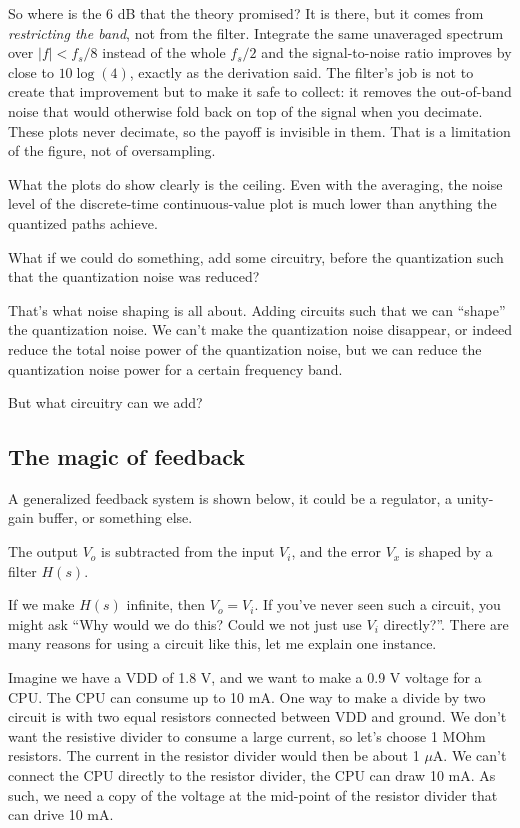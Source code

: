So where is the 6 dB that the theory promised? It is there, but it comes
from \emph{restricting the band}, not from the filter. Integrate the
same unaveraged spectrum over \(\vert f\vert < f_s/8\) instead of the
whole \(f_s/2\) and the signal-to-noise ratio improves by close to
\(10\log(4)\), exactly as the derivation said. The filter's job is not
to create that improvement but to make it safe to collect: it removes
the out-of-band noise that would otherwise fold back on top of the
signal when you decimate. These plots never decimate, so the payoff is
invisible in them. That is a limitation of the figure, not of
oversampling.

What the plots do show clearly is the ceiling. Even with the averaging,
the noise level of the discrete-time continuous-value plot is much lower
than anything the quantized paths achieve.

What if we could do something, add some circuitry, before the
quantization such that the quantization noise was reduced?

That's what noise shaping is all about. Adding circuits such that we can
``shape'' the quantization noise. We can't make the quantization noise
disappear, or indeed reduce the total noise power of the quantization
noise, but we can reduce the quantization noise power for a certain
frequency band.

But what circuitry can we add?

\subsection{The magic of feedback}\label{the-magic-of-feedback}

A generalized feedback system is shown below, it could be a regulator, a
unity-gain buffer, or something else.

The output \(V_o\) is subtracted from the input \(V_i\), and the error
\(V_x\) is shaped by a filter \(H(s)\).

If we make \(H(s)\) infinite, then \(V_o = V_i\). If you've never seen
such a circuit, you might ask ``Why would we do this? Could we not just
use \(V_i\) directly?''. There are many reasons for using a circuit like
this, let me explain one instance.

Imagine we have a VDD of 1.8 V, and we want to make a 0.9 V voltage for
a CPU. The CPU can consume up to 10 mA. One way to make a divide by two
circuit is with two equal resistors connected between VDD and ground. We
don't want the resistive divider to consume a large current, so let's
choose 1 MOhm resistors. The current in the resistor divider would then
be about 1 \(\mu\)A. We can't connect the CPU directly to the resistor
divider, the CPU can draw 10 mA. As such, we need a copy of the voltage
at the mid-point of the resistor divider that can drive 10 mA.

